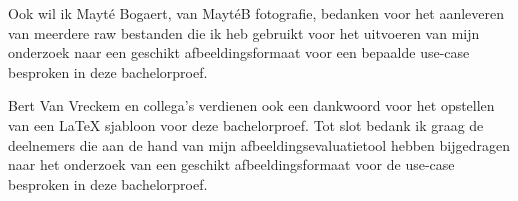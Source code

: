 Ook wil ik Mayté Bogaert, van MaytéB fotografie, bedanken voor het aanleveren van meerdere \gls{raw} bestanden die ik heb gebruikt voor het uitvoeren van mijn onderzoek naar een geschikt \gls{afbeeldingsformaat} voor een bepaalde \gls{use-case} besproken in deze bachelorproef.

Bert Van Vreckem en collega's verdienen ook een dankwoord voor het opstellen van een \LaTeX{} sjabloon voor deze bachelorproef. Tot slot bedank ik graag de deelnemers die aan de hand van mijn \gls{afbeeldingsevaluatietool} hebben bijgedragen naar het onderzoek van een geschikt \gls{afbeeldingsformaat} voor de \gls{use-case} besproken in deze bachelorproef.